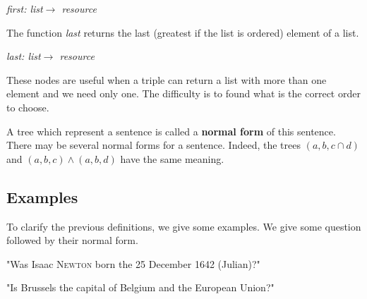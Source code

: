 \begin{center}
\textsl{first: list$\rightarrow$ resource}
\end{center}

The function \textsl{last} returns the last (greatest if the list is ordered) element of a list.

\begin{center}
\textsl{last: list$\rightarrow$ resource}
\end{center}

These nodes are useful when a triple can return a list with more than one element and we need only one. The difficulty is to found what is the correct order to choose.

\bigskip

A tree which represent a sentence is called a 
{\bf normal form} of this sentence. There may be several normal forms for a sentence. Indeed, the trees $(a,b,c\cap d)$ and $(a,b,c)\wedge(a,b,d)$ have the same meaning.

\subsection{Examples}

To clarify the previous definitions, we give some examples. We give some question followed by their normal form.

\FloatBarrier
\bigskip

"Was Isaac \textsc{Newton} born the 25 December 1642 (Julian)?"

\begin{figure}[!ht]
    \centering
\end{figure}

\FloatBarrier
\bigskip

"Is Brussels the capital of Belgium and the European Union?"

